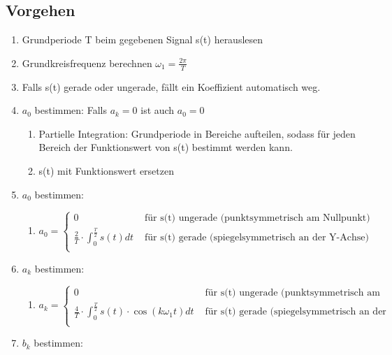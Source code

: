 \subsection{Vorgehen}
\begin{enumerate}
	\item Grundperiode T beim gegebenen Signal s(t) herauslesen
	\item Grundkreisfrequenz berechnen $\omega_1 = \frac{2\pi}{T}$
	\item Falls s(t) gerade oder ungerade, fällt ein Koeffizient automatisch weg. 
	\item $a_0$ bestimmen: Falls $a_k = 0$ ist auch $a_0 = 0$ 
	\begin{enumerate}
		\item Partielle Integration: Grundperiode in Bereiche aufteilen, sodass für jeden Bereich der Funktionswert von s(t) bestimmt werden kann. 
		\item s(t) mit Funktionswert ersetzen
	\end{enumerate}
	\item $a_0$ bestimmen:
	\begin{enumerate}
		\item $a_0 =  \begin{cases}
		0 & \text{ für s(t) ungerade (punktsymmetrisch am Nullpunkt)} \\
		\frac{2}{T} \cdot \int_{0}^{\frac{T}{2}} s(t) dt & \text{ für s(t) gerade (spiegelsymmetrisch an der Y-Achse)} \\
		\end{cases}$
	\end{enumerate}
	\item $a_k$ bestimmen:
	\begin{enumerate}
		\item $a_k =  \begin{cases}
		0 & \text{ für s(t) ungerade (punktsymmetrisch am Nullpunkt)} \\
		\frac{4}{T} \cdot \int_{0}^{\frac{T}{2}} s(t) \cdot \cos(k \omega_1 t) dt & \text{ für s(t) gerade (spiegelsymmetrisch an der Y-Achse)} \\
		\end{cases}$
	\end{enumerate}
	\item $b_k$ bestimmen:
\end{enumerate}
